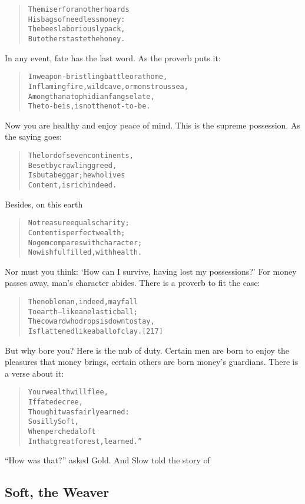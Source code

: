 \documentclass[article, twoside, 14pt]{memoir}
\renewenvironment{verbatim}{%
\begin{quote}%
\vskip -10pt%
\begin{alltt}\normalfont\large}{\end{alltt}%
\end{quote}%
\vskip -10pt
} %
\begin{document}
\begin{verbatim}
The miser for another hoards
    His bags of needless money:
The bees laboriously pack,
    But others taste the honey.
\end{verbatim}
In any event, fate has the last word. As the proverb puts it:

\begin{verbatim}
In weapon-bristling battle or at home,
    In flaming fire, wild cave, or monstrous sea,
Among thanatophidian fangs elate,
    The to-be is, is not the not-to-be.
\end{verbatim}
Now you are healthy and enjoy peace of mind. This is the supreme
possession. As the saying goes:

\begin{verbatim}
The lord of seven continents,
    Beset by crawling greed,
Is but a beggar; he who lives
    Content, is rich indeed.
\end{verbatim}
Besides, on this earth

\begin{verbatim}
No treasure equals charity;
    Content is perfect wealth;
No gem compares with character;
    No wish fulfilled, with health.
\end{verbatim}
Nor must you think:
`How can I survive, having lost my possessions?' For money passes
away, man's character abides. There is a proverb to fit the case:

\begin{verbatim}
The noble man, indeed, may fall
To earth--like an elastic ball;
The coward who drops is down to stay,
Is flattened like a ball of clay.                       [217]
\end{verbatim}
But why bore you? Here is the nub of duty. Certain men are born to
enjoy the pleasures that money brings, certain others are born
money's guardians. There is a verse about it:

\begin{verbatim}
Your wealth will flee,
If fate decree,
Though it was fairly earned:
    So silly Soft,
    When perched aloft
In that great forest, learned.”
\end{verbatim}
``How was that?'' asked Gold. And Slow told the story of

\subsection{Soft, the Weaver}

\label{s42}
\end{document}
